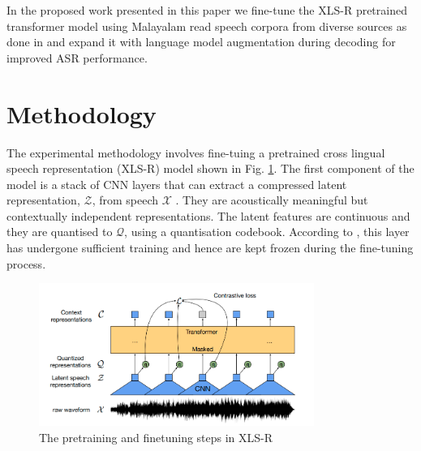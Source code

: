 \documentclass[runningheads]{llncs}
\begin{document}

In the proposed work presented in this paper we fine-tune the XLS-R pretrained transformer model using Malayalam read speech corpora from diverse sources as done in \cite{manohar2023automatic} and expand it with language model augmentation during decoding for improved ASR performance. 


\section{Methodology}



The experimental methodology involves fine-tuing a pretrained cross lingual speech representation (XLS-R) model shown in Fig. \ref{finetune}. The first component of the model is a stack of CNN layers that can extract a compressed latent representation, $\mathcal{Z}$, from speech $\mathcal{X}$ \cite{babu2021xls}. They are acoustically meaningful but contextually independent representations. The latent features are continuous and they are quantised to $\mathcal{Q}$, using a quantisation codebook. According to \cite{babu2021xls}, this layer has undergone sufficient training and hence are kept frozen during the fine-tuning process.

\begin{figure}[!h]
    \includegraphics[width=0.8\textwidth]{xlsr.png}
    \centering
    \caption{The pretraining and finetuning steps in XLS-R} 
    \label{finetune}
\end{figure}
\end{document}
